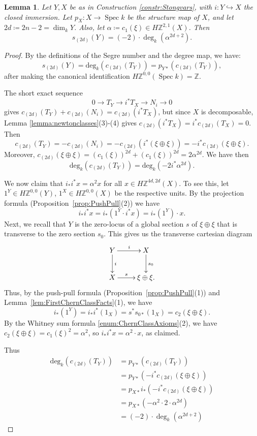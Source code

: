 \documentclass[10pt]{amsart}
\theoremstyle{definition}
\theoremstyle{plain}
\newtheorem{lemma}[defn]{Lemma}
\numberwithin{equation}{section}
\newcommand{\0}{\emptyset}
\newcommand{\Z}{{\mathbb Z}}
\newcommand{\Spec}{{\operatorname{Spec}}}
\renewcommand{\deg}{{\operatorname{deg}}}
\renewcommand{\dim}{{\operatorname{dim}}}
\begin{document}
 \begin{lemma}
\label{lemma:segrenumbers}
    Let $Y, X$ be as in Construction \ref{constr:Stongvars}, with $i:Y \hookrightarrow X$ the closed immersion. Let $p_X:X \to \Spec k$ be the structure map of $X$, and let $2d \coloneqq 2n-2=\dim_kY$. Also, let $\alpha \coloneqq c_1(\xi) \in H\mathbb{Z}^{2,1}(X)$. Then
    $$s_{(2d)}(Y)= (-2)\cdot\deg_k(\alpha^{2d+2}).$$
\end{lemma}

\begin{proof}
    By the definitions of the Segre number and the degree map, we have:
    $$s_{(2d)}(Y) =\text{deg}_k(c_{(2d)}(T_Y))=p_{Y*}(c_{(2d)}(T_Y)),$$
    after making the canonical identification $H\Z^{0,0}(\Spec k)=\Z$.
    
    The short exact sequence
    $$0 \to T_Y \to i^*T_X \to N_i \to 0$$
    gives $c_{(2d)}(T_Y) + c_{(2d)}(N_i)=c_{(2d)}(i^*T_X)$, but since $X$ is decomposable, Lemma \ref{lemma:newtonclasses}(3)-(4) gives $c_{(2d)}(i^*T_X)=i^*c_{(2d)}(T_X)=0$. Then $$c_{(2d)}(T_Y)=-c_{(2d)}(N_i)=-c_{(2d)}(i^*(\xi \oplus \xi))=-i^*c_{(2d)}(\xi \oplus \xi).$$
    Moreover, $c_{(2d)}(\xi \oplus \xi)=(c_1(\xi))^{2d}+(c_1(\xi))^{2d}=2\alpha^{2d}$. We have then
    $$\text{deg}_k(c_{(2d)}(T_Y))= \text{deg}_k(-2i^*\alpha^{2d}).$$
    
    We now claim that $i_*i^*x = \alpha^2 x$ for all $x \in H\mathbb{Z}^{4d,2d}(X)$. To see this, let $1^Y\in H\mathbb{Z}^{0,0}(Y)$, $1^X\in H\mathbb{Z}^{0,0}(X)$   be the respective units. By the projection formula (Proposition~\ref{prop:PushPull}(2)) we have 
  \[
  i_*i^*x=i_*(1^Y\cdot i^*x)= i_*(1^Y)\cdot x.
  \]
  Next, we recall that $Y$ is the zero-locus of a global section $s$ of $\xi \oplus \xi$ that is transverse to the zero section $s_0$. This gives us the transverse cartesian diagram
\[
\xymatrix{
Y\ar[r]^i\ar[d]^-i&X\ar[d]^{s_0}\\
X\ar[r]^-s&\xi \oplus \xi.
}
\]
Thus, by the push-pull formula (Proposition~\ref{prop:PushPull}(1)) and Lemma~\ref{lem:FirstChernClassFacts}(1), we have
\[
i_*(1^Y)=i_*i^*(1_X)=s^*s_{0*}(1_X)=c_2(\xi \oplus \xi).
\]
By the Whitney sum formula \eqref{enum:ChernClassAxioms}(2), we have $c_2(\xi \oplus \xi)=c_1(\xi)^2=\alpha^2$, 
so $ i_*i^*x=\alpha^2\cdot x$, as claimed.
  
  Thus
 \begin{align*}
 \text{deg}_k(c_{(2d)}(T_Y))&=  p_{Y*}(c_{(2d)}(T_Y))\\
 &=p_{Y*}(-i^*c_{(2d)}(\xi \oplus \xi))\\
 &=p_{X*}i_*(-i^*c_{(2d)}(\xi \oplus \xi))\\
&=p_{X*}(-\alpha^2\cdot 2\cdot\alpha^{2d})\\
&=(-2)\cdot\deg_k(\alpha^{2d+2})
\end{align*}    
\end{proof}
\end{document}
